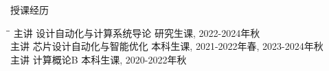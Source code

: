 \begin{rSection}{授课经历}

\begin{tabbing}
\hspace{0.8in}\= \hspace{3.3in}\= \kill
主讲 \> 设计自动化与计算系统导论 \> { 研究生课, 2022-2024年秋} \\
主讲 \> 芯片设计自动化与智能优化 \> { 本科生课, 2021-2022年春, 2023-2024年秋 } \\
主讲 \> 计算概论B \> { 本科生课, 2020-2022年秋 } \\
\end{tabbing}

\end{rSection}
